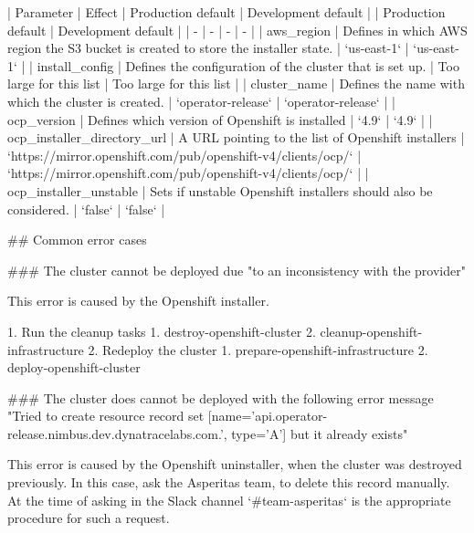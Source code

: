 | Parameter | Effect | Production default | Development default |                                                                                                      | Production default             | Development default                     |
| - | - | - | - |
| aws_region | Defines in which AWS region the S3 bucket is created to store the installer state. | `us-east-1` | `us-east-1` |
| install_config | Defines the configuration of the cluster that is set up. | Too large for this list | Too large for this list |
| cluster_name | Defines the name with which the cluster is created. | `operator-release` | `operator-release` |
| ocp_version | Defines which version of Openshift is installed | `4.9` | `4.9` |
| ocp_installer_directory_url | A URL pointing to the list of Openshift installers | `https://mirror.openshift.com/pub/openshift-v4/clients/ocp/` | `https://mirror.openshift.com/pub/openshift-v4/clients/ocp/` |
| ocp_installer_unstable | Sets if unstable Openshift installers should also be considered. | `false` | `false` |

## Common error cases

### The cluster cannot be deployed due "to an inconsistency with the provider"

This error is caused by the Openshift installer.

1. Run the cleanup tasks
   1. destroy-openshift-cluster
   2. cleanup-openshift-infrastructure
2. Redeploy the cluster
   1. prepare-openshift-infrastructure
   2. deploy-openshift-cluster

### The cluster does cannot be deployed with the following error message "Tried to create resource record set [name='api.operator-release.nimbus.dev.dynatracelabs.com.', type='A'] but it already exists"

This error is caused by the Openshift uninstaller, when the cluster was destroyed previously.
In this case, ask the Asperitas team, to delete this record manually.
At the time of asking in the Slack channel `#team-asperitas` is the appropriate procedure for such a request.
